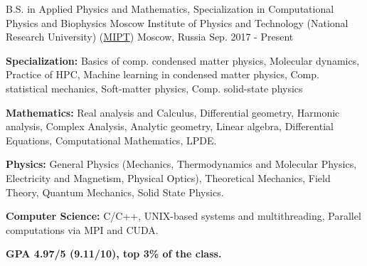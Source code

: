 

\begin{cventries}

  \cventry
    {B.S. in Applied Physics and Mathematics, Specialization in Computational Physics and Biophysics} %
    {Moscow Institute of Physics and Technology (National Research University) (\href{https://mipt.ru/english/}{MIPT})} %
    {Moscow, Russia} %
    {Sep. 2017 - Present} %
    {
      \begin{cvitems} %
        \item {\textbf{Specialization:} Basics of comp. condensed matter physics, Molecular dynamics, Practice of HPC, Machine learning in condensed matter physics, Comp. statistical mechanics, Soft-matter physics, Comp. solid-state physics}
        \item {\textbf{Mathematics:} Real analysis and Calculus, Differential geometry, Harmonic analysis, Complex Analysis, Analytic geometry, Linear algebra, Differential Equations, Computational Mathematics, LPDE.}
        \item {\textbf{Physics:} General Physics (Mechanics, Thermodynamics and Molecular Physics, Electricity and Magnetism, Physical Optics), Theoretical Mechanics, Field Theory, Quantum Mechanics, Solid State Physics.}
        \item {\textbf{Computer Science:}  C/C++, UNIX-based systems and multithreading, Parallel computations via MPI and CUDA.}
		\item {\textbf{GPA 4.97/5 (9.11/10), top 3\% of the class.}}        
      \end{cvitems}
    }

\end{cventries}

